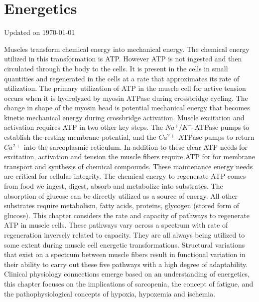 \chapter{Energetics}\label{chp:energetics}
Updated on \today
\minitoc

Muscles transform chemical energy into mechanical energy. The chemical energy utilized in this transformation is ATP. However ATP is not ingested and then circulated through the body to the cells. It is present in the cells in small quantities and regenerated in the cells at a rate that approximates its rate of utilization. The primary utilization of ATP in the muscle cell for active tension occurs when it is hydrolyzed by myosin ATPase during crossbridge cycling. The change in shape of the myosin head is potential mechanical energy that becomes kinetic mechanical energy during crossbridge activation. Muscle excitation and activation requires ATP in two other key steps. The $Na^+ / K^+$-ATPase pumps to establish the resting membrane potential, and the $Ca^{2+}$-ATPase pumps to return $Ca^{2+}$ into the sarcoplasmic reticulum. In addition to these clear ATP needs for excitation, activation and tension the muscle fibers require ATP for for membrane transport and synthesis of chemical compounds. These maintenance energy needs are critical for cellular integrity. 
The chemical energy to regenerate ATP comes from food we ingest, digest, absorb and metabolize into substrates. The absorption of glucose can be directly utilized as a source of energy. All other substrates require metabolism, fatty acids, proteins, glycogen (stored form of glucose).
This chapter considers the rate and capacity of pathways to regenerate ATP in muscle cells. These pathways vary across a spectrum with rate of regeneration inversely related to capacity. They are all always being utilized to some extent during muscle cell energetic transformations. Structural variations that exist on a spectrum between muscle fibers result in functional variation in their ability to carry out these five pathways with a high degree of adaptability. Clinical physiology connections emerge based on an understanding of energetics, this chapter focuses on the implications of sarcopenia, the concept of fatigue, and the pathophysiological concepts of hypoxia, hypoxemia and ischemia.

